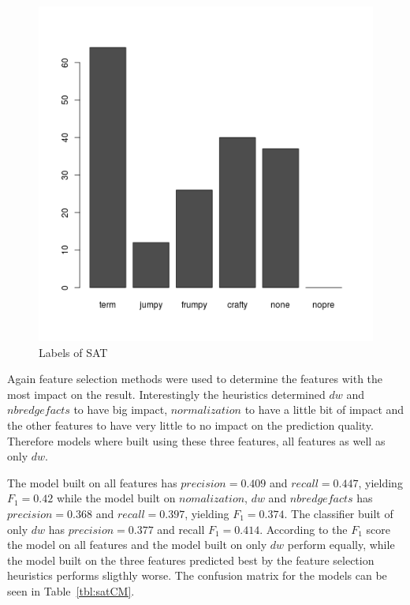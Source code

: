 \begin{figure}[h]
	\center
	\includegraphics[scale=0.4]{figures/satLabels.png}
	\caption{Labels of SAT\label{fig:satLabels}}
\end{figure}

\par Again feature selection methods were used to determine the features with the most impact on the result. Interestingly the heuristics determined $dw$ and $nbredgefacts$ to have big impact, $normalization$ to have a little bit of impact and the other features to have very little to no impact on the prediction quality. Therefore models where built using these three features, all features as well as only $dw$.

The model built on all features has $precision=0.409$ and $recall=0.447$, yielding $F_1=0.42$ while the model built on $nomalization$, $dw$ and $nbredgefacts$ has $precision=0.368$ and $recall=0.397$, yielding $F_1 =0.374$. The classifier built of only $dw$ has $precision=0.377$ and recall $F_1=0.414$. According to the $F_1$ score the model on all features and the model built on only $dw$ perform equally, while the model built on the three features predicted best by the feature selection heuristics performs sligthly worse. The confusion matrix for the models can be seen in Table~\ref{tbl:satCM}.


